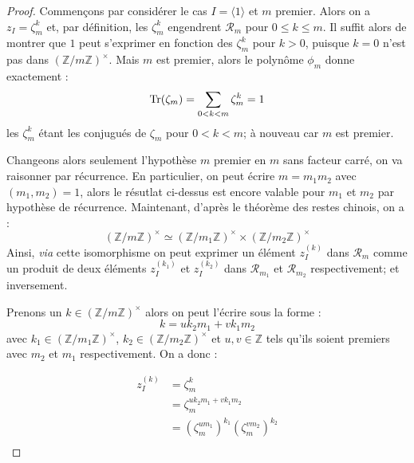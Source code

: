 \documentclass[a4paper]{article} %
\numberwithin{equation}{section}
\newcommand\zmodn[1]{\mathbb{Z}/#1\mathbb{Z}}
\newcommand\zmodninv[1]{(\mathbb{Z}/#1\mathbb{Z})^{\times}}
\begin{document}
\begin{proof}
Commençons par considérer le cas $I = \langle1\rangle$ et $m$ premier. Alors on a $z_I = \zeta_m^k$ et, par définition, les $\zeta_m^k$ engendrent $\mathcal{R}_m$ pour $0 \leq k\leq m$. Il suffit alors de montrer que $1$ peut s'exprimer en fonction des $\zeta_m^k$ pour $k > 0$, puisque $k = 0$ n'est pas dans $(\zmodn{m})^{\times}$. Mais $m$ est premier, alors le polynôme $\phi_m$ donne exactement :
\[\textup{Tr}(\zeta_m) = \sum_{0 < k < m}{\zeta_m^k} = 1\]
les $\zeta_m^k$ étant les conjugués de $\zeta_m$ pour $0 < k < m$; à nouveau car $m$ est premier.\\\par
Changeons alors seulement l'hypothèse $m$ premier en $m$ sans facteur carré, on va raisonner par récurrence. En particulier, on peut écrire $m = m_1m_2$ avec $(m_1,m_2) = 1$, alors le résutlat ci-dessus est encore valable pour $m_1$ et $m_2$ par hypothèse de récurrence. Maintenant, d'après le théorème des restes chinois, on a :
\[\zmodninv{m} \simeq \zmodninv{m_1} \times \zmodninv{m_2}\]
Ainsi, \textit{via} cette isomorphisme on peut exprimer un élément $z_I^{(k)}$ dans $\mathcal{R}_m$ comme un produit de deux éléments $z_I^{(k_1)}$ et $z_I^{(k_2)}$ dans $\mathcal{R}_{m_1}$ et $\mathcal{R}_{m_2}$ respectivement; et inversement.\par
Prenons un $k\in\zmodninv{m}$ alors on peut l'écrire sous la forme :
\[k = uk_2m_1 + vk_1m_2\]
avec $k_1\in\zmodninv{m_1}$, $k_2\in\zmodninv{m_2}$ et $u,v\in\mathbb{Z}$ tels qu'ils soient premiers avec $m_2$ et $m_1$ respectivement. On a donc :

\begin{align*}
z_I^{(k)} &= \zeta_m^k\\
&= \zeta_m^{uk_2m_1 + vk_1m_2}\\
&= (\zeta_m^{um_1})^{k_1}(\zeta_m^{vm_2})^{k_2}\\
\end{align*}


\end{proof}
\end{document}

